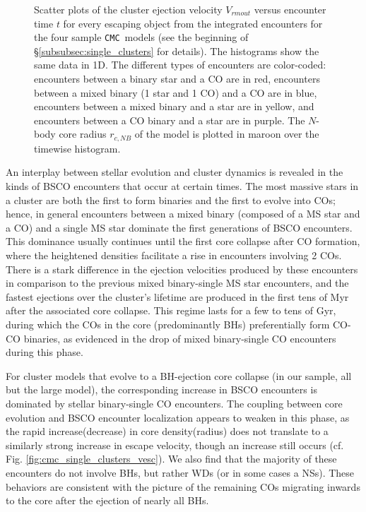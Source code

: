 \documentclass[twocolumn]{aastex631}
\newcommand{\CMC}{\texttt{CMC}}
\begin{document}
\begin{figure*}
    \caption{
        Scatter plots of the cluster ejection velocity $V_{rm out}$ versus encounter time $t$ for every escaping object from the integrated encounters for the four sample \CMC\ models (see the beginning of \S\ref{subsubsec:single_clusters} for details).
        The histograms show the same data in 1D.
        The different types of encounters are color-coded: encounters between a binary star and a CO are in red,
        encounters between a mixed binary (1 star and 1 CO) and a CO are in blue, encounters between a mixed binary and a star are in yellow, and encounters between a CO binary and a star are in purple.
        The $N$-body core radius $r_{c, NB}$ \citep{1985ApJ...298...80C} of the model is plotted in maroon over the timewise histogram.
    }
    \label{fig:cmc_single_clusters}
\end{figure*}

An interplay between stellar evolution and cluster dynamics is revealed in the kinds of BSCO encounters that occur at certain times.
The most massive stars in a cluster are both the first to form binaries and the first to evolve into COs; hence, in general encounters between a mixed binary (composed of a MS star and a CO) and a single MS star dominate the first generations of BSCO encounters.
This dominance usually continues until the first core collapse after CO formation, where the heightened densities facilitate a rise in encounters involving 2 COs.
There is a stark difference in the ejection velocities produced by these encounters in comparison to the previous mixed binary-single MS star encounters, and the fastest ejections over the cluster's lifetime are produced in the first tens of Myr after the associated core collapse.
This regime lasts for a few to tens of Gyr, during which the COs in the core (predominantly BHs) preferentially form CO-CO binaries, as evidenced in the drop of mixed binary-single CO encounters during this phase.

For cluster models that evolve to a BH-ejection core collapse (in our sample, all but the large model), the corresponding increase in BSCO encounters is dominated by stellar binary-single CO encounters.
The coupling between core evolution and BSCO encounter localization appears to weaken in this phase, as the rapid increase(decrease) in core density(radius) does not translate to a similarly strong increase in escape velocity, though an increase still occurs (cf. Fig. \ref{fig:cmc_single_clusters_vesc}).
We also find that the majority of these encounters do not involve BHs, but rather WDs (or in some cases a NSs).
These behaviors are consistent with the picture of the remaining COs migrating inwards to the core after the ejection of nearly all BHs.
\end{document}
